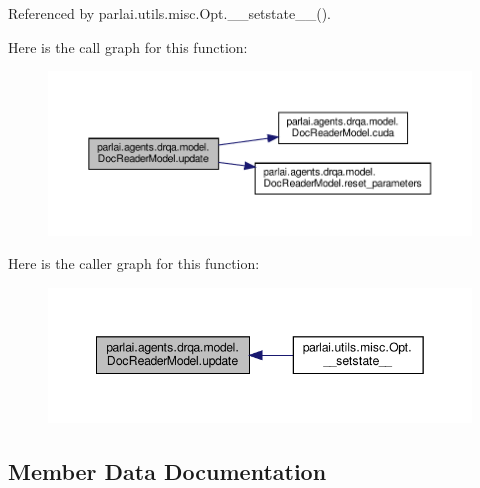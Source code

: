 Referenced by parlai.\+utils.\+misc.\+Opt.\+\_\+\+\_\+setstate\+\_\+\+\_\+().

Here is the call graph for this function\+:
\nopagebreak
\begin{figure}[H]
\begin{center}
\leavevmode
\includegraphics[width=350pt]{classparlai_1_1agents_1_1drqa_1_1model_1_1DocReaderModel_afd9953bd722fe099619e883981e3fc38_cgraph}
\end{center}
\end{figure}
Here is the caller graph for this function\+:
\nopagebreak
\begin{figure}[H]
\begin{center}
\leavevmode
\includegraphics[width=349pt]{classparlai_1_1agents_1_1drqa_1_1model_1_1DocReaderModel_afd9953bd722fe099619e883981e3fc38_icgraph}
\end{center}
\end{figure}


\subsection{Member Data Documentation}
\mbox{\label{classparlai_1_1agents_1_1drqa_1_1model_1_1DocReaderModel_a89edfda425c66170c166156d5f3e8a18}} 
